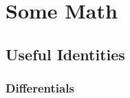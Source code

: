 \documentclass[../class_mech_main.tex]{subfiles}
\begin{document}
\chapter{Some Math}


    \section{Useful Identities}
        \subsection{Differentials}



\end{document}
